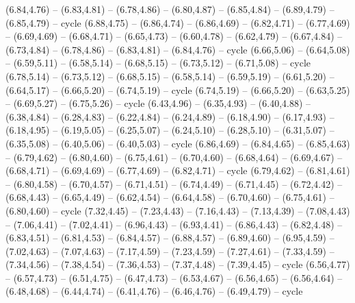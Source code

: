 \expandafter\def\csname geo:gebiet:MDA\endcsname{
  (6.84,4.76) -- (6.83,4.81) -- (6.78,4.86) -- (6.80,4.87) -- (6.85,4.84) -- (6.89,4.79) -- (6.85,4.79) -- cycle}
\expandafter\def\csname geo:gebiet:ROU\endcsname{
  (6.88,4.75) -- (6.86,4.74) -- (6.86,4.69) -- (6.82,4.71) -- (6.77,4.69) -- (6.69,4.69) -- (6.68,4.71) -- (6.65,4.73) -- (6.60,4.78) -- (6.62,4.79) -- (6.67,4.84) -- (6.73,4.84) -- (6.78,4.86) -- (6.83,4.81) -- (6.84,4.76) -- cycle}
\expandafter\def\csname geo:gebiet:LTU\endcsname{
  (6.66,5.06) -- (6.64,5.08) -- (6.59,5.11) -- (6.58,5.14) -- (6.68,5.15) -- (6.73,5.12) -- (6.71,5.08) -- cycle}
\expandafter\def\csname geo:gebiet:LVA\endcsname{
  (6.78,5.14) -- (6.73,5.12) -- (6.68,5.15) -- (6.58,5.14) -- (6.59,5.19) -- (6.61,5.20) -- (6.64,5.17) -- (6.66,5.20) -- (6.74,5.19) -- cycle}
\expandafter\def\csname geo:gebiet:EST\endcsname{
  (6.74,5.19) -- (6.66,5.20) -- (6.63,5.25) -- (6.69,5.27) -- (6.75,5.26) -- cycle}
\expandafter\def\csname geo:gebiet:DEU\endcsname{
  (6.43,4.96) -- (6.35,4.93) -- (6.40,4.88) -- (6.38,4.84) -- (6.28,4.83) -- (6.22,4.84) -- (6.24,4.89) -- (6.18,4.90) -- (6.17,4.93) -- (6.18,4.95) -- (6.19,5.05) -- (6.25,5.07) -- (6.24,5.10) -- (6.28,5.10) -- (6.31,5.07) -- (6.35,5.08) -- (6.40,5.06) -- (6.40,5.03) -- cycle}
\expandafter\def\csname geo:gebiet:BGR\endcsname{
  (6.86,4.69) -- (6.84,4.65) -- (6.85,4.63) -- (6.79,4.62) -- (6.80,4.60) -- (6.75,4.61) -- (6.70,4.60) -- (6.68,4.64) -- (6.69,4.67) -- (6.68,4.71) -- (6.69,4.69) -- (6.77,4.69) -- (6.82,4.71) -- cycle}
\expandafter\def\csname geo:gebiet:GRC\endcsname{
  (6.79,4.62) -- (6.81,4.61) -- (6.80,4.58) -- (6.70,4.57) -- (6.71,4.51) -- (6.74,4.49) -- (6.71,4.45) -- (6.72,4.42) -- (6.68,4.43) -- (6.65,4.49) -- (6.62,4.54) -- (6.64,4.58) -- (6.70,4.60) -- (6.75,4.61) -- (6.80,4.60) -- cycle}
\expandafter\def\csname geo:gebiet:TUR\endcsname{
  (7.32,4.45) -- (7.23,4.43) -- (7.16,4.43) -- (7.13,4.39) -- (7.08,4.43) -- (7.06,4.41) -- (7.02,4.41) -- (6.96,4.43) -- (6.93,4.41) -- (6.86,4.43) -- (6.82,4.48) -- (6.83,4.51) -- (6.81,4.53) -- (6.84,4.57) -- (6.88,4.57) -- (6.89,4.60) -- (6.95,4.59) -- (7.02,4.63) -- (7.07,4.63) -- (7.17,4.59) -- (7.23,4.59) -- (7.27,4.61) -- (7.33,4.59) -- (7.34,4.56) -- (7.38,4.54) -- (7.36,4.53) -- (7.37,4.48) -- (7.39,4.45) -- cycle}
\expandafter\def\csname geo:gebiet:ALB\endcsname{
  }
\expandafter\def\csname geo:gebiet:HRV\endcsname{
  (6.56,4.77) -- (6.57,4.73) -- (6.51,4.75) -- (6.47,4.73) -- (6.53,4.67) -- (6.56,4.65) -- (6.56,4.64) -- (6.48,4.68) -- (6.44,4.74) -- (6.41,4.76) -- (6.46,4.76) -- (6.49,4.79) -- cycle}
